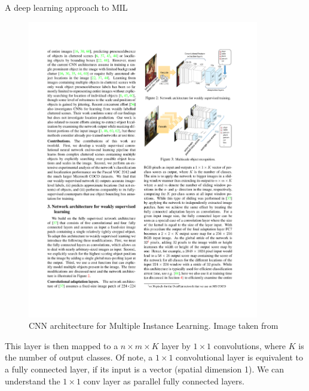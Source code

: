 \documentclass[xcolor=pdftex,dvipsnames,table]{beamer}
\begin{document}
\begin{frame}[noframenumbering]{A deep learning approach to MIL}
\begin{figure}[htb]
   \centering
   \includegraphics[width=0.9\textwidth]{../graphics/mil_deep_learning_v1.pdf}
   \caption{CNN architecture for Multiple Instance Learning. Image taken from \cite{Oquab2015}}
\end{figure}
This layer is then mapped to a $n \times m \times K$ layer by $1 \times 1$ convolutions, where $K$ is the number of output classes. Of note, a $1 \times 1$ convolutional layer is equivalent to a fully connected layer, if its input is a vector (spatial dimension 1). We can understand the $1 \times 1$ conv layer as parallel fully connected layers. 
\end{frame}
\end{document}
